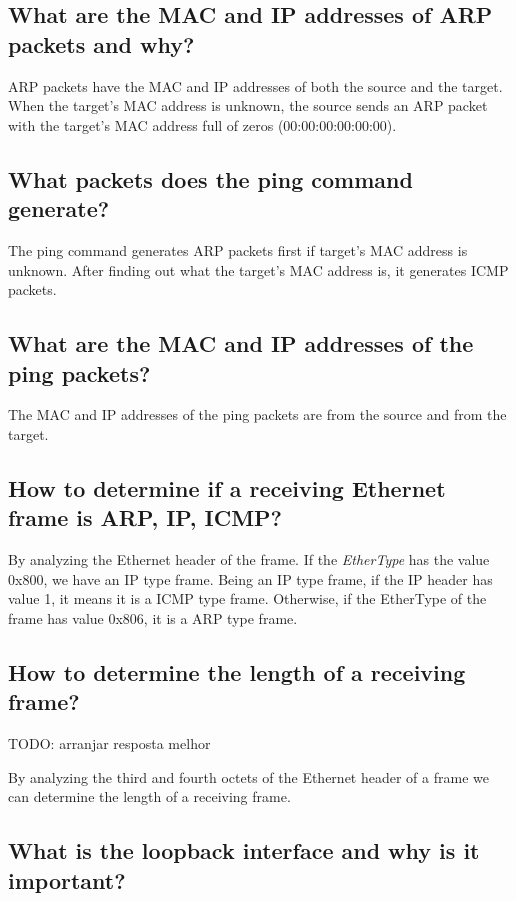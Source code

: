 \documentclass[11pt]{report}
\begin{document}
\subsection{What are the MAC and IP addresses of ARP packets and why?}

ARP packets have the MAC and IP addresses of both the source and the target. When the target's MAC address is unknown, the source sends an ARP packet with the target's MAC address full of zeros (00:00:00:00:00:00). 

\subsection{What packets does the ping command generate?}
The ping command generates ARP packets first if target's MAC address is unknown. After finding out what the target's MAC address is, it generates ICMP packets.

\subsection{What are the MAC and IP addresses of the ping packets?}

The MAC and IP addresses of the ping packets are from the source and from the target.

\subsection{How to determine if a receiving Ethernet frame is ARP, IP, ICMP?}

By analyzing the Ethernet header of the frame. If the \textit{EtherType} has the value 0x800, we have an IP type frame. Being an IP type frame, if the IP header has value 1, it means it is a ICMP type frame. Otherwise, if the EtherType of the frame has value 0x806, it is a ARP type frame.

\subsection{How to determine the length of a receiving frame?}

TODO: arranjar resposta melhor

By analyzing the third and fourth octets of the Ethernet header of a frame we can determine the length of a receiving frame.

\subsection{What is the loopback interface and why is it important?}
\end{document}
